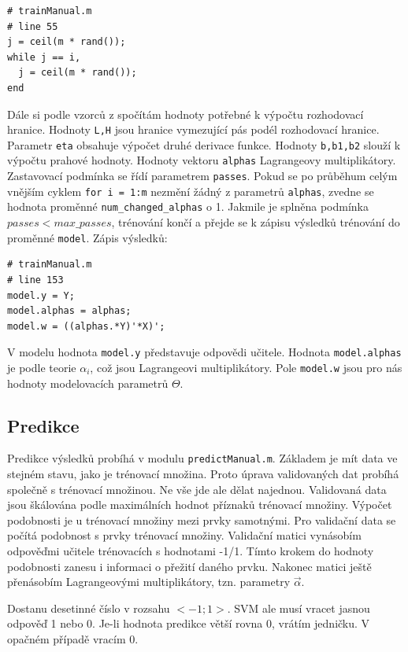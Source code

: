 \documentclass[a4]{article}
\begin{document}
\begin{lstlisting}
# trainManual.m
# line 55
j = ceil(m * rand());
while j == i,
  j = ceil(m * rand());
end
\end{lstlisting}

\noindent Dále si podle vzorců z \cite{smo_platt_original} spočítám hodnoty potřebné k výpočtu rozhodovací hranice. Hodnoty \texttt{L,H} jsou hranice vymezující pás podél rozhodovací hranice. Parametr \texttt{eta} obsahuje výpočet druhé derivace funkce. Hodnoty \texttt{b,b1,b2}  slouží k výpočtu prahové hodnoty. Hodnoty vektoru \texttt{alphas} Lagrangeovy multiplikátory. Zastavovací podmínka se řídí parametrem \texttt{passes}. Pokud se po průběhum celým vnějším cyklem \texttt{for i = 1:m} nezmění žádný z parametrů \texttt{alphas}, zvedne se hodnota proměnné \texttt{num\_changed\_alphas} o 1. Jakmile je splněna podmínka $passes < max\_passes$, trénování končí a přejde se k zápisu výsledků trénování do proměnné \texttt{model}. Zápis výsledků:

\begin{lstlisting}
# trainManual.m
# line 153
model.y = Y;
model.alphas = alphas;
model.w = ((alphas.*Y)'*X)';
\end{lstlisting}

\noindent V modelu hodnota \texttt{model.y} představuje odpovědi učitele. Hodnota \texttt{model.alphas} je podle teorie $\alpha_i$, což jsou Lagrangeovi multiplikátory. Pole \texttt{model.w} jsou pro nás hodnoty modelovacích parametrů $\Theta$.

\subsection{Predikce}
Predikce výsledků probíhá v modulu \texttt{predictManual.m}. Základem je mít data ve stejném stavu, jako je trénovací množina. Proto úprava validovaných dat probíhá společně s trénovací množinou. Ne vše jde ale dělat najednou. Validovaná data jsou škálována podle maximálních hodnot příznaků trénovací množiny. Výpočet podobnosti je u trénovací množiny mezi prvky samotnými. Pro validační data se počítá podobnost s prvky trénovací množiny. Validační matici vynásobím odpověďmi učitele trénovacích s hodnotami -1/1. Tímto krokem do hodnoty podobnosti zanesu i informaci o přežití daného prvku. Nakonec matici ještě přenásobím Lagrangeovými multiplikátory, tzn. parametry $\vec{\alpha}$.

\noindent Dostanu desetinné číslo v rozsahu $<-1;1>$. SVM ale musí vracet jasnou odpověď 1 nebo 0. Je-li hodnota predikce větší rovna 0, vrátím jedničku. V opačném případě vracím 0.
\end{document}

